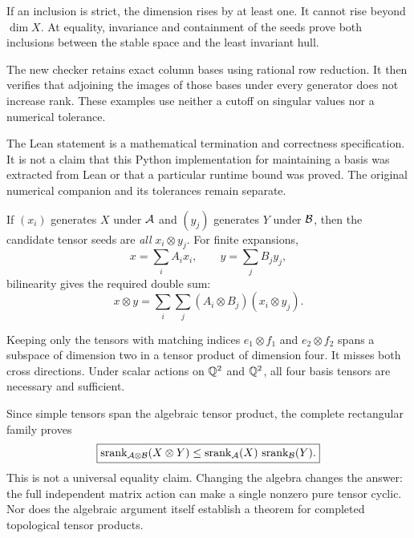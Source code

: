 
If an inclusion is strict, the dimension rises by at least one. It cannot rise beyond $\dim X$. At equality, invariance and containment of the seeds prove both inclusions between the stable space and the least invariant hull.

The new checker retains exact column bases using rational row reduction. It then verifies that adjoining the images of those bases under every generator does not increase rank. These examples use neither a cutoff on singular values nor a numerical tolerance.

The Lean statement is a mathematical termination and correctness specification. It is not a claim that this Python implementation for maintaining a basis was extracted from Lean or that a particular runtime bound was proved. The original numerical companion and its tolerances remain separate.


If $(x_i)$ generates $X$ under $\AA$ and $(y_j)$ generates $Y$ under $\BB$, then the candidate tensor seeds are \emph{all} $x_i\otimes y_j$. For finite expansions,
\[
x=\sum_i A_ix_i,\qquad y=\sum_j B_jy_j,
\]
bilinearity gives the required double sum:
\[
x\otimes y=\sum_i\sum_j(A_i\otimes B_j)(x_i\otimes y_j).
\]


Keeping only the tensors with matching indices $e_1\otimes f_1$ and $e_2\otimes f_2$ spans a subspace of dimension two in a tensor product of dimension four. It misses both cross directions. Under scalar actions on $\QQ^2$ and $\QQ^2$, all four basis tensors are necessary and sufficient.

Since simple tensors span the algebraic tensor product, the complete rectangular family proves
\[
\boxed{\srank_{\AA\otimes\BB}(X\otimes Y)
\le\srank_{\AA}(X)\,\srank_{\BB}(Y).}
\]
This is not a universal equality claim. Changing the algebra changes the answer: the full independent matrix action can make a single nonzero pure tensor cyclic. Nor does the algebraic argument itself establish a theorem for completed topological tensor products.

